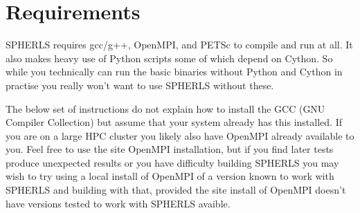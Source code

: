 \documentclass[12pt,a4paper]{book}
\begin{document}
\section{Requirements}
SPHERLS requires gcc/g++, OpenMPI, and PETSc to compile and run at all. It also makes heavy use of Python scripts some of which depend on Cython. So while you technically can run the basic binaries without Python and Cython in practise you really won't want to use SPHERLS without these.

The below set of instructions do not explain how to install the GCC (GNU Compiler Collection) but assume that your system already has this installed. If you are on a large HPC cluster you likely also have OpenMPI already available to you. Feel free to use the site OpenMPI installation, but if you find later tests produce unexpected results or you have difficulty building SPHERLS you may wish to try using a local install of OpenMPI of a version known to work with SPHERLS and building with that, provided the site install of OpenMPI doesn't have versions tested to work with SPHERLS avaible.
\end{document}

